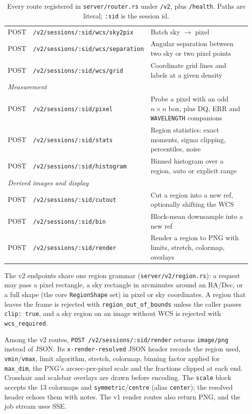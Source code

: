 \documentclass[11pt,a4paper]{article}
\newcommand{\code}[1]{\texttt{\small #1}}
\begin{document}
\begin{table}[H]
\begin{tabularx}{\textwidth}{llX}
            POST & \code{/v2/sessions/:sid/wcs/sky2pix} & Batch sky $\to$ pixel \\
            POST & \code{/v2/sessions/:sid/wcs/separation} & Angular separation between two sky or two pixel points \\
            POST & \code{/v2/sessions/:sid/wcs/grid} & Coordinate grid lines and labels at a given density \\
            \midrule
            \multicolumn{3}{l}{\textit{Measurement}} \\
            POST & \code{/v2/sessions/:sid/pixel} & Probe a pixel with an odd $n\times n$ box, plus DQ, ERR and \code{WAVELENGTH} companions \\
            POST & \code{/v2/sessions/:sid/stats} & Region statistics: exact moments, sigma clipping, percentiles, noise \\
            POST & \code{/v2/sessions/:sid/histogram} & Binned histogram over a region, auto or explicit range \\
            \midrule
            \multicolumn{3}{l}{\textit{Derived images and display}} \\
            POST & \code{/v2/sessions/:sid/cutout} & Cut a region into a new ref, optionally shifting the WCS \\
            POST & \code{/v2/sessions/:sid/bin} & Block-mean downsample into a new ref \\
            POST & \code{/v2/sessions/:sid/render} & Render a region to PNG with limits, stretch, colormap, overlays \\
            \bottomrule
        \end{tabularx}
        \caption{Every route registered in \code{server/router.rs} under \code{/v2}, plus \code{/health}. Paths are literal; \code{:sid} is the session id.}
    \end{table}

    The v2 endpoints share one region grammar (\code{server/v2/region.rs}): a request may pass a pixel rectangle, a sky rectangle in arcminutes around an RA/Dec, or a full shape (the core \code{RegionShape} set) in pixel or sky coordinates. A region that leaves the frame is rejected with \code{region\_out\_of\_bounds} unless the caller passes \code{clip: true}, and a sky region on an image without WCS is rejected with \code{wcs\_required}.

    Among the v2 routes, \code{POST /v2/sessions/:sid/render} returns \code{image/png} instead of JSON. Its \code{x-render-resolved} JSON header records the region used, \code{vmin}/\code{vmax}, limit algorithm, stretch, colormap, binning factor applied for \code{max\_dim}, the PNG's arcsec-per-pixel scale and the fractions clipped at each end. Crosshair and scalebar overlays are drawn before encoding. The \code{scale} block accepts the 13 colormaps and \code{symmetric}/\code{centre} (alias \code{center}); the resolved header echoes them with notes. The v1 render routes also return PNG, and the job stream uses SSE.
\end{document}
